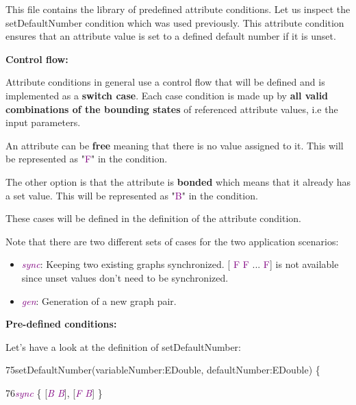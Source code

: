 {This file contains the library of predefined attribute conditions. Let us inspect the setDefaultNumber condition which was used previously. This attribute condition ensures that an attribute value is set to a defined default number if it is unset. \newline

\textbf{Control flow:}

Attribute conditions in general
use a control flow that will be defined and is implemented as a \textbf{switch case}. Each case condition is made up by \textbf{all valid combinations of the bounding states} of referenced attribute values, i.e the input parameters.\newline

An attribute can be \textbf{free} meaning that there is no value assigned to it. This will be represented as "\textcolor{Purple}{F}" in the condition.

The other option is that the attribute is \textbf{bonded} which means that it already has a set value. This will be represented as "\textcolor{Purple}{B}" in the condition.

These cases will be defined in the definition of the attribute condition.\newline

Note that there are two different sets of cases for the two application scenarios:

\begin{itemize}
    \item\textcolor{Purple}{\textit{sync}}: Keeping two existing graphs synchronized. [\textcolor{Purple}{ F F } ... \textcolor{Purple}{ F}] is not available since unset values don't need to be synchronized.
    \item\textcolor{Purple}{\textit{gen}}: Generation of a new graph pair.
\end{itemize}

\clearpage

\textbf{Pre-defined conditions:}

Let's have a look at the definition of \textsf{setDefaultNumber}:\newline

{

75\hspace{0.5cm}setDefaultNumber(variableNumber:EDouble, defaultNumber:EDouble) \{

76\hspace{1cm}\textcolor{Purple}{\textit{sync}} \{ [\textcolor{Purple}{\textit{B B}}], [\textcolor{Purple}{\textit{F B}}] \}

}}
